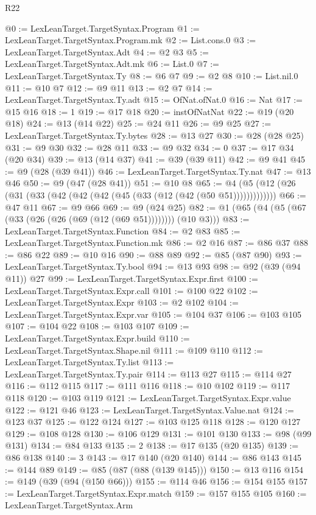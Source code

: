 \begin{lexlean}{R22}
\begin{coremodule}
@0 := LexLeanTarget.TargetSyntax.Program
@1 := LexLeanTarget.TargetSyntax.Program.mk
@2 := List.cons.{0}
@3 := LexLeanTarget.TargetSyntax.Adt
@4 := @2 @3
@5 := LexLeanTarget.TargetSyntax.Adt.mk
@6 := List.{0}
@7 := LexLeanTarget.TargetSyntax.Ty
@8 := @6 @7
@9 := @2 @8
@10 := List.nil.{0}
@11 := @10 @7
@12 := @9 @11
@13 := @2 @7
@14 := LexLeanTarget.TargetSyntax.Ty.adt
@15 := OfNat.ofNat.{0}
@16 := Nat
@17 := @15 @16
@18 := 1
@19 := @17 @18
@20 := instOfNatNat
@22 := @19 (@20 @18)
@24 := @13 (@14 @22)
@25 := @24 @11
@26 := @9 @25
@27 := LexLeanTarget.TargetSyntax.Ty.bytes
@28 := @13 @27
@30 := @28 (@28 @25)
@31 := @9 @30
@32 := @28 @11
@33 := @9 @32
@34 := 0
@37 := @17 @34 (@20 @34)
@39 := @13 (@14 @37)
@41 := @39 (@39 @11)
@42 := @9 @41
@45 := @9 (@28 (@39 @41))
@46 := LexLeanTarget.TargetSyntax.Ty.nat
@47 := @13 @46
@50 := @9 (@47 (@28 @41))
@51 := @10 @8
@65 := @4 (@5 (@12 (@26 (@31 (@33 (@42 (@42 (@42 (@45 (@33 (@12 (@42 (@50 @51)))))))))))))
@66 := @47 @11
@67 := @9 @66
@69 := @9 (@24 @25)
@82 := @1 (@65 (@4 (@5 (@67 (@33 (@26 (@26 (@69 (@12 (@69 @51)))))))) (@10 @3)))
@83 := LexLeanTarget.TargetSyntax.Function
@84 := @2 @83
@85 := LexLeanTarget.TargetSyntax.Function.mk
@86 := @2 @16
@87 := @86 @37
@88 := @86 @22
@89 := @10 @16
@90 := @88 @89
@92 := @85 (@87 @90)
@93 := LexLeanTarget.TargetSyntax.Ty.bool
@94 := @13 @93
@98 := @92 (@39 (@94 @11)) @27
@99 := LexLeanTarget.TargetSyntax.Expr.first
@100 := LexLeanTarget.TargetSyntax.Expr.call
@101 := @100 @22
@102 := LexLeanTarget.TargetSyntax.Expr
@103 := @2 @102
@104 := LexLeanTarget.TargetSyntax.Expr.var
@105 := @104 @37
@106 := @103 @105
@107 := @104 @22
@108 := @103 @107
@109 := LexLeanTarget.TargetSyntax.Expr.build
@110 := LexLeanTarget.TargetSyntax.Shape.nil
@111 := @109 @110
@112 := LexLeanTarget.TargetSyntax.Ty.list
@113 := LexLeanTarget.TargetSyntax.Ty.pair
@114 := @113 @27
@115 := @114 @27
@116 := @112 @115
@117 := @111 @116
@118 := @10 @102
@119 := @117 @118
@120 := @103 @119
@121 := LexLeanTarget.TargetSyntax.Expr.value
@122 := @121 @46
@123 := LexLeanTarget.TargetSyntax.Value.nat
@124 := @123 @37
@125 := @122 @124
@127 := @103 @125 @118
@128 := @120 @127
@129 := @108 @128
@130 := @106 @129
@131 := @101 @130
@133 := @98 (@99 @131)
@134 := @84 @133
@135 := 2
@138 := @17 @135 (@20 @135)
@139 := @86 @138
@140 := 3
@143 := @17 @140 (@20 @140)
@144 := @86 @143
@145 := @144 @89
@149 := @85 (@87 (@88 (@139 @145)))
@150 := @13 @116
@154 := @149 (@39 (@94 (@150 @66)))
@155 := @114 @46
@156 := @154 @155
@157 := LexLeanTarget.TargetSyntax.Expr.match
@159 := @157 @155 @105
@160 := LexLeanTarget.TargetSyntax.Arm

\end{coremodule}
\end{lexlean}
